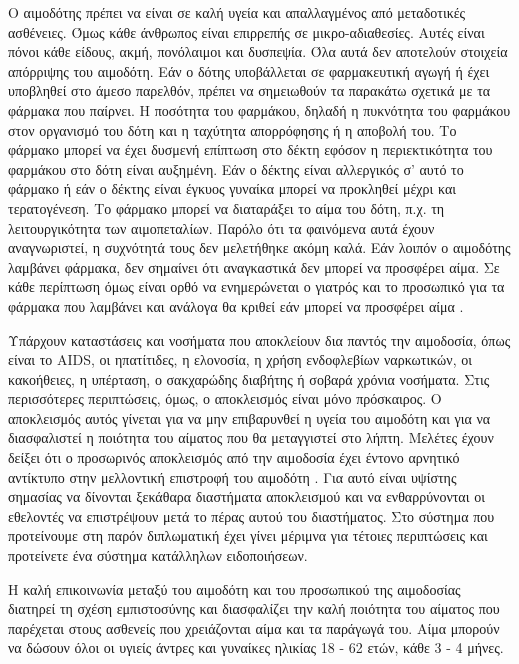 			Ο αιμοδότης πρέπει να είναι σε καλή υγεία και απαλλαγμένος από μεταδοτικές ασθένειες. Όμως κάθε άνθρωπος είναι επιρρεπής σε μικρο-αδιαθεσίες. Αυτές είναι πόνοι κάθε είδους, ακμή, πονόλαιμοι και δυσπεψία. Όλα αυτά δεν αποτελούν στοιχεία απόρριψης του αιμοδότη. Εάν ο δότης υποβάλλεται σε φαρμακευτική αγωγή ή έχει υποβληθεί στο άμεσο παρελθόν, πρέπει να σημειωθούν τα παρακάτω σχετικά με τα φάρμακα που παίρνει. Η ποσότητα του φαρμάκου, δηλαδή η πυκνότητα του φαρμάκου στον οργανισμό του δότη και η ταχύτητα απορρόφησης ή η αποβολή του. Το φάρμακο μπορεί να έχει δυσμενή επίπτωση στο δέκτη εφόσον η περιεκτικότητα του φαρμάκου στο δότη είναι αυξημένη. Εάν ο δέκτης είναι αλλεργικός σ' αυτό το φάρμακο ή εάν ο δέκτης είναι έγκυος γυναίκα μπορεί να προκληθεί μέχρι και τερατογένεση. Το φάρμακο μπορεί να διαταράξει το αίμα του δότη, π.χ. τη λειτουργικότητα των αιμοπεταλίων. Παρόλο ότι τα φαινόμενα αυτά έχουν αναγνωριστεί, η συχνότητά τους δεν μελετήθηκε ακόμη καλά. Εάν λοιπόν ο αιμοδότης λαμβάνει φάρμακα, δεν σημαίνει ότι αναγκαστικά δεν μπορεί να προσφέρει αίμα. Σε κάθε περίπτωση όμως είναι ορθό να ενημερώνεται ο γιατρός και το προσωπικό για τα φάρμακα που λαμβάνει και ανάλογα θα κριθεί εάν μπορεί να προσφέρει αίμα \cite{bloodDonorSelection}. 
			
		Υπάρχουν καταστάσεις και νοσήματα που αποκλείουν δια παντός την αιμοδοσία, όπως είναι το AIDS, οι ηπατίτιδες, η ελονοσία, η χρήση ενδοφλεβίων ναρκωτικών, οι κακοήθειες, η υπέρταση, ο σακχαρώδης διαβήτης ή σοβαρά χρόνια νοσήματα. Στις περισσότερες περιπτώσεις, όμως, ο αποκλεισμός είναι μόνο πρόσκαιρος.  Ο αποκλεισμός αυτός γίνεται για να μην επιβαρυνθεί η υγεία του αιμοδότη και για να διασφαλιστεί η ποιότητα του αίματος που θα μεταγγιστεί στο λήπτη. Μελέτες έχουν δείξει ότι ο προσωρινός αποκλεισμός από την αιμοδοσία έχει έντονο αρνητικό αντίκτυπο στην μελλοντική επιστροφή του αιμοδότη \cite{Custer2011}\cite{Custer2007}. Για αυτό είναι υψίστης σημασίας να δίνονται ξεκάθαρα διαστήματα αποκλεισμού και να ενθαρρύνονται οι εθελοντές να επιστρέψουν μετά το πέρας αυτού του διαστήματος. Στο σύστημα που προτείνουμε στη παρόν διπλωματική έχει γίνει μέριμνα για τέτοιες περιπτώσεις και προτείνετε ένα σύστημα κατάλληλων ειδοποιήσεων.
		
		Η καλή επικοινωνία μεταξύ του αιμοδότη και του προσωπικού της αιμοδοσίας διατηρεί τη σχέση εμπιστοσύνης και διασφαλίζει την καλή ποιότητα του αίματος που παρέχεται στους ασθενείς που χρειάζονται αίμα και τα παράγωγά του. Αίμα μπορούν να δώσουν όλοι οι υγιείς άντρες και γυναίκες ηλικίας 18 - 62 ετών, κάθε 3 - 4 μήνες. 

